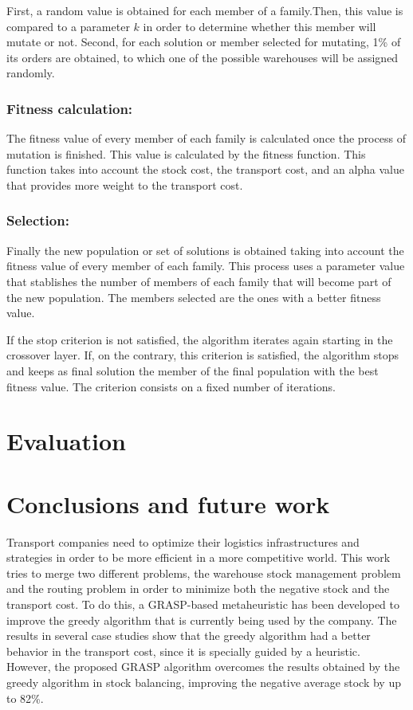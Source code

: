 \documentclass[letterpaper]{article} %
\begin{document}
First, a random value is obtained for each member of a family.Then, this value is compared to a parameter $k$ in order to determine whether this member will mutate or not. Second, for each solution or member selected for mutating, 1\% of its orders are obtained, to which one of the possible warehouses will be assigned randomly.

\subsubsection*{Fitness calculation:}
The fitness value of every member of each family is calculated once the process of mutation is finished. This value is calculated by the fitness function.
This function takes into account the stock cost, the transport cost, and an alpha value that provides more weight to the transport cost.

\subsubsection*{Selection:}
Finally the new population or set of solutions is obtained taking into account the fitness value of every member of each family. This process uses a parameter value that stablishes the number of members of each family that will become part of the new population. The members selected are the ones with a better fitness value.

If the stop criterion is not satisfied, the algorithm iterates again starting in the crossover layer. If, on the contrary, this criterion is satisfied, the algorithm stops and keeps as final solution the member of the final population with the best fitness value. The criterion consists on a fixed number of iterations.
\section*{Evaluation}




\section*{Conclusions and future work}


Transport companies need to optimize their logistics infrastructures and strategies in order to be more efficient in a more competitive world. This work tries to merge two different problems, the warehouse stock management problem and the routing problem in order to minimize both the negative stock and the transport cost. To do this, a GRASP-based metaheuristic has been developed to improve the greedy algorithm that is currently being used by the company. The results in several case studies show that the greedy algorithm had a better behavior in the transport cost, since it is specially guided by a heuristic. However, the proposed GRASP algorithm overcomes the results obtained by the greedy algorithm in stock balancing, improving the negative average stock by up to 82\%.
\end{document}
